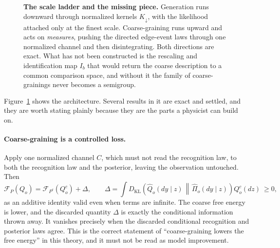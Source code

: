 \documentclass[11pt,letterpaper]{article}
\newcommand{\KL}{D_{\mathrm{KL}}}
\newcommand{\Fen}{\mathcal F}
\begin{document}
\begin{figure}[t]
\caption{\textbf{The scale ladder and the missing piece.} Generation runs downward
through normalized kernels $K_\downarrow$, with the likelihood attached only at the
finest scale. Coarse-graining runs upward and acts on \emph{measures}, pushing the
directed edge-event laws through one normalized channel and then disintegrating. Both
directions are exact. What has not been constructed is the rescaling and identification map
$I_b$ that would return the coarse description to a common comparison space, and
without it the family of coarse-grainings never becomes a semigroup.}
\label{fig:ladder}
\end{figure}

Figure~\ref{fig:ladder} shows the architecture. Several results in it are exact and
settled, and they are worth stating plainly because they are the parts a physicist
can build on.

\paragraph{Coarse-graining is a controlled loss.} Apply one normalized channel $C$,
which must not read the recognition law, to both the recognition law and the
posterior, leaving the observation untouched. Then
\begin{equation}
\Fen_P(Q_o) = \Fen_{P^c}(Q^c_o) + \Delta,
\qquad
\Delta = \int \KL\!\left(\widehat Q_o(dy \mid z) \,\middle\Vert\,
\widehat\Pi_o(dy \mid z)\right) Q^c_o(dz) \ \ge 0,
\end{equation}
as an additive identity valid even when terms are infinite. The coarse free energy
is lower, and the discarded quantity $\Delta$ is exactly the conditional information
thrown away. It vanishes precisely when the discarded conditional recognition and
posterior laws agree. This is the correct statement of ``coarse-graining lowers the
free energy'' in this theory, and it must not be read as model improvement.
\end{document}
